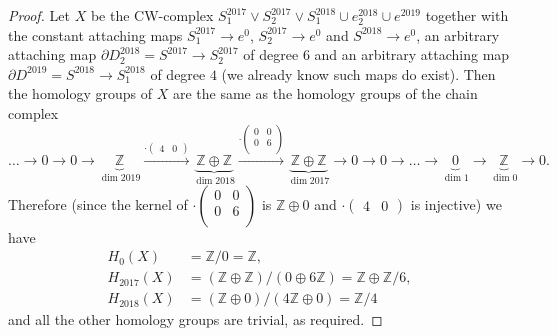 \documentclass[12pt,a4paper]{article}
\newcommand{\Z}{\mathbb{Z}}
\newcommand{\dd}{\partial}
\newcounter{exercise}
\begin{document}
\pagestyle{fancy}                      %
\fancyhf{}                             %
\addtolength{\topmargin}{-30 pt}                   %
\setlength{\headsep}{10 pt}                      %
\renewcommand{\headrulewidth}{1 pt}                %
\renewcommand*{\proofname}{Solution}
\ex\mbox{} 
\begin{proof}
Let $X$ be the CW-complex $S^{2017}_1\vee S^{2017}_2\vee S_1^{2018} \cup e_2^{2018}\cup e^{2019}$ together with the constant attaching maps $S^{2017}_1\to e^0$, $S^{2017}_2\to e^0$ and $S^{2018}\to e^0$, an arbitrary attaching map $\dd D_2^{2018}=S^{2017}\to S_2^{2017}$ of degree $6$ and an arbitrary attaching map $\dd D^{2019}=S^{2018}\to S_1^{2018}$ of degree $4$ (we already know such maps do exist). Then the homology groups of $X$ are the same as the homology groups of the chain complex
$$\dots \to 0 \to 0 \to \underbrace{\Z}_{\dim 2019} \xrightarrow{\cdot\begin{pmatrix}
        4&0
    \end{pmatrix}}\underbrace{\Z\oplus \Z}_{\dim 2018}\xrightarrow{\cdot\begin{pmatrix}
        0&0\\
        0&6\\
    \end{pmatrix}}\underbrace{\Z\oplus\Z}_{\dim 2017}\to 0\to 0\to\dots\to\underbrace{0}_{\dim 1}\to \underbrace{\Z}_{\dim 0}\to 0.$$
Therefore (since the kernel of $\cdot\begin{pmatrix}
        0&0\\
        0&6\\
    \end{pmatrix}$ is $\Z\oplus 0$ and $\cdot\begin{pmatrix}
        4&0
    \end{pmatrix}$ is injective) we have
\begin{equation*}
\begin{split}
H_0(X)&=\Z/0=\Z,\\
H_{2017}(X)&=(\Z\oplus\Z)/(0\oplus 6\Z)=\Z\oplus \Z/6,\\
H_{2018}(X)&=(\Z\oplus 0)/(4\Z\oplus 0)=\Z/4
\end{split}
\end{equation*}
and all the other homology groups are trivial, as required.
\end{proof}
\end{document}
